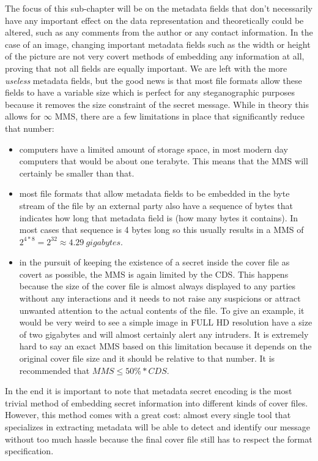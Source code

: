 \begin{multicols*}{2}
The focus of this sub-chapter will be on the metadata fields that don't necessarily have any important effect on the data representation and theoretically could be altered, such as any comments from the author or any contact information. In the case of an image, changing important metadata fields such as the width or height of the picture are not very covert methods of embedding any information at all, proving that not all fields are equally important. We are left with the more \textit{useless} metadata fields, but the good news is that most file formats allow these fields to have a variable size which is perfect for any steganographic purposes because it removes the size constraint of the secret message. While in theory this allows for $\infty$ MMS, there are a few limitations in place that significantly reduce that number: 
\begin{itemize}
  \item computers have a limited amount of storage space, in most modern day computers that would be about one terabyte. This means that the MMS will certainly be smaller than that.
  \item most file formats that allow metadata fields to be embedded in the byte stream of the file by an external party also have a sequence of bytes that indicates how long that metadata field is (how many bytes it contains). In most cases that sequence is 4 bytes long so this usually results in a MMS of $2^{4*8} = 2^{32} \approx 4.29\ gigabytes$.
  \item in the pursuit of keeping the existence of a secret inside the cover file as covert as possible, the MMS is again limited by the CDS. This happens because the size of the cover file is almost always displayed to any parties without any interactions and it needs to not raise any suspicions or attract unwanted attention to the actual contents of the file. To give an example, it would be very weird to see a simple image in FULL HD resolution have a size of two gigabytes and will almost certainly alert any intruders. It is extremely hard to say an exact MMS based on this limitation because it depends on the original cover file size and it should be relative to that number. It is recommended that $MMS \leq  50\% * CDS$.
\end{itemize}

In the end it is important to note that metadata secret encoding is the most trivial method of embedding secret information into different kinds of cover files. However, this method comes with a great cost: almost every single tool that specializes in extracting metadata will be able to detect and identify our message without too much hassle because the final cover file still has to respect the format specification.


\end{multicols*}
